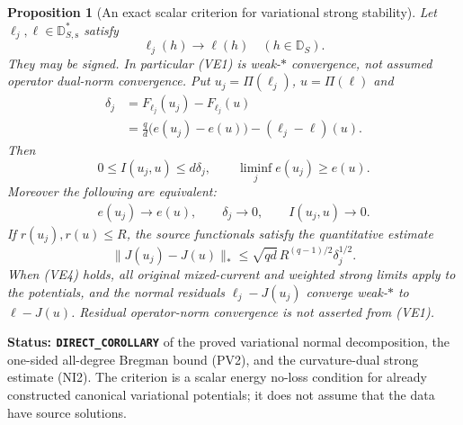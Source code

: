 \documentclass[11pt,a4paper]{article}
\numberwithin{equation}{section}
\newtheorem{proposition}[theorem]{Proposition}
\theoremstyle{definition}
\theoremstyle{remark}
\begin{document}
\begin{proposition}[An exact scalar criterion for variational strong stability]
\label{prop:r12-weak-dual-energy-no-loss}
Let $\ell_j,\ell\in\mathbb D_{S,\mathrm s}^*$ satisfy
\[
            \ell_j(h)\longrightarrow\ell(h)
                                 \quad(h\in\mathbb D_S).
 \tag{VE1}
\]
They may be signed. In particular (VE1) is weak-$*$
convergence, not assumed operator dual-norm convergence.
Put $u_j=\Pi(\ell_j)$, $u=\Pi(\ell)$ and
\[
 \begin{split}
 \delta_j
   &=F_{\ell_j}(u_j)-F_{\ell_j}(u)\\
   &=\frac qd\bigl(e(u_j)-e(u)\bigr)-(\ell_j-\ell)(u).
 \end{split}
 \tag{VE2}
\]
Then
\[
                     0\leq I(u_j,u)\leq d\delta_j,
               \qquad \liminf_j e(u_j)\geq e(u).
 \tag{VE3}
\]
Moreover the following are equivalent:
\[
 \begin{gathered}
             e(u_j)\longrightarrow e(u),\qquad
             \delta_j\longrightarrow0,\qquad
             I(u_j,u)\longrightarrow0.
 \end{gathered}
 \tag{VE4}
\]
If $r(u_j),r(u)\leq R$, the source functionals satisfy
the quantitative estimate
\[
       \|J(u_j)-J(u)\|_*
              \leq\sqrt{qd}\,R^{(q-1)/2}\delta_j^{1/2}.
 \tag{VE5}
\]
When (VE4) holds, all original mixed-current and weighted
strong limits apply to the potentials, and the normal
residuals $\ell_j-J(u_j)$ converge weak-$*$ to
$\ell-J(u)$. Residual operator-norm convergence is not
asserted from (VE1).
\end{proposition}

\noindent\textbf{Status: \texttt{DIRECT\_COROLLARY}} of
the proved variational normal decomposition, the one-sided
all-degree Bregman bound (PV2), and the curvature-dual
strong estimate (NI2). The criterion is a scalar energy
no-loss condition for already constructed canonical
variational potentials; it does not assume that the data
have source solutions.
\end{document}
